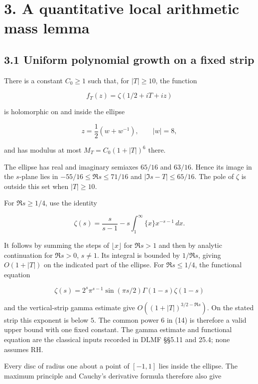 \section{3. A quantitative local arithmetic mass
lemma}\label{GraphV2:a-quantitative-local-arithmetic-mass-lemma}

\subsection{3.1 Uniform polynomial growth on a fixed
strip}\label{GraphV2:uniform-polynomial-growth-on-a-fixed-strip}

There is a constant \(C_0\ge1\) such that, for \(|T|\ge10\), the
function

\[
 f_T(z)=\zeta(1/2+iT+iz)                                                \tag{14}
\]

is holomorphic on and inside the ellipse

\[
 z=\frac12(w+w^{-1}),\qquad |w|=8,
                                                                         \tag{15}
\]

and has modulus at most \(M_T=C_0(1+|T|)^6\) there.

The ellipse has real and imaginary semiaxes \(65/16\) and \(63/16\).
Hence its image in the \(s\)-plane lies in \(-55/16\le\Re s\le71/16\)
and \(|\Im s-T|\le65/16\). The pole of \(\zeta\) is outside this set
when \(|T|\ge10\).

For \(\Re s\ge1/4\), use the identity

\[
 \zeta(s)=\frac{s}{s-1}-s\int_1^\infty\{x\}x^{-s-1}\,dx.              \tag{16}
\]

It follows by summing the steps of \(\lfloor x\rfloor\) for \(\Re s>1\)
and then by analytic continuation for \(\Re s>0\), \(s\ne1\). Its
integral is bounded by \(1/\Re s\), giving \(O(1+|T|)\) on the indicated
part of the ellipse. For \(\Re s\le1/4\), the functional equation

\[
 \zeta(s)=2^s\pi^{s-1}\sin(\pi s/2)\Gamma(1-s)\zeta(1-s)              \tag{17}
\]

and the vertical-strip gamma estimate give \(O((1+|T|)^{3/2-\Re s})\).
On the stated strip this exponent is below \(5\). The common power \(6\)
in (14) is therefore a valid upper bound with one fixed constant. The
gamma estimate and functional equation are the classical inputs recorded
in DLMF §§5.11 and 25.4; none assumes RH.

Every disc of radius one about a point of \([-1,1]\) lies inside the
ellipse. The maximum principle and Cauchy's derivative formula therefore
also give

